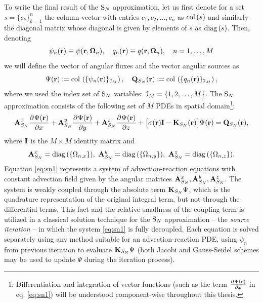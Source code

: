 To write  the final result of the $\text{S}_{N}$ approximation, let us first denote for a set $s = \{c_k\}_{k=1}^n$ the column
vector with entries $c_1,c_2,\ldots,c_n$ as $\operatorname{col\,}(s)$ and similarly the diagonal matrix whose diagonal is
given by elements of $s$ as $\operatorname{diag\,}(s)$. Then, denoting
\begin{equation}\label{eq:sn_vecs}
\psi_n(\mathbf{r}) \equiv \psi(\mathbf{r},\mathbf{\Omega}_n), \quad q_n(\mathbf{r}) \equiv
q(\mathbf{r},\mathbf{\Omega}_n),\quad n = 1,\ldots, M	
\end{equation}
we will define the vector of angular fluxes and the vector angular sources as
\begin{equation}\label{eq:sn_vars}
\Psi(\mathbf{r}) := \operatorname{col\,}\left(\{\psi_n(\mathbf{r})\}_{\mathcal{I}_{M}}\right),\quad
\mathbf{Q}_{S_N}(\mathbf{r}) := \operatorname{col\,}\left(\{q_n(\mathbf{r})\}_{\mathcal{I}_{M}}\right),
\end{equation}
where we used the index set of $\text{S}_{N}$ variables: $\mathcal{I}_{M} = \{1,2,\ldots,M\}$.
The $\text{S}_{N}$ approximation consists of the following set of $M$ PDEs in spatial domain\footnote{Differentiation and
integration of vector functions (such as the term $\frac{\partial^{}\Psi(\mathbf{r})}{\partial x^{}}$ in eq. \eqref{eq:sn1}) will be understood
component-wise throughout this thesis.}:
\begin{equation}\label{eq:sn1} 
\mathbf{A}_{S_N}^x\frac{\partial^{}\Psi(\mathbf{r})}{\partial x^{}} + \mathbf{A}_{S_N}^y\frac{\partial^{}\Psi(\mathbf{r})}{\partial y^{}} +
\mathbf{A}_{S_N}^z\frac{\partial^{}\Psi(\mathbf{r})}{\partial z^{}} + \bigl[\sigma(\mathbf{r})\mathbf{I} - \mathbf{K}_{S_N}(\mathbf{r})\bigr]\Psi(\mathbf{r}) = \mathbf{Q}_{S_N}(\mathbf{r}),
\end{equation}
where $\mathbf{I}$ is the $M\times M$ identity matrix and
$$
	\mat{A}_{S_N}^x = \diag(\{\Omega_{n,x}\}),\ \mat{A}_{S_N}^y = \diag(\{\Omega_{n,y}\}),\ \mat{A}_{S_N}^z =
	\diag(\{\Omega_{n,z}\}).
$$
Equation
\eqref{eq:sn1} represents a system of advection-reaction equations with constant advection field given by the angular 
matrices $\mathbf{A}_{S_N}^x, \mathbf{A}_{S_N}^y, \mathbf{A}_{S_N}^z$. The system is weakly coupled through the absolute term
$\mathbf{K}_{S_N}\Psi$, which is the quadrature representation of the original integral term, but not through the
differential terms. This fact and the relative smallness of the coupling term is utilized in a classical solution
technique for the $\text{S}_{N}$ approximation -- the \textit{source iteration} -- in which the system \eqref{eq:sn1} is fully
decoupled. Each equation is solved separately using any method suitable for an advection-reaction PDE, using $\psi_n$
from previous iteration to evaluate $\mathbf{K}_{S_N}\Psi$ (both Jacobi and Gauss-Seidel schemes may be used to update
$\Psi$ during the iteration process).

